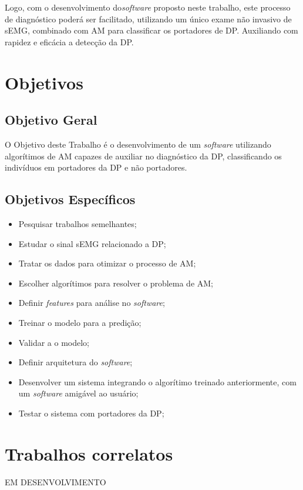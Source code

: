 Logo, com o desenvolvimento do\textit{software} proposto neste trabalho, este processo de diagnóstico poderá ser facilitado, utilizando um único exame não invasivo de sEMG, combinado com AM para classificar os portadores de DP. Auxiliando com rapidez e eficácia a detecção da DP. 

\section{Objetivos} 
\subsection{Objetivo Geral} 
O Objetivo deste Trabalho é o desenvolvimento de um \textit{software} utilizando algorítimos de AM capazes de auxiliar no diagnóstico da DP, classificando os indivíduos em portadores da DP e não portadores. 

\subsection{Objetivos Específicos}
\begin{itemize}
    \item Pesquisar trabalhos semelhantes;
    \item Estudar o sinal sEMG relacionado a DP;
    \item Tratar os dados para otimizar o processo de AM;
    \item Escolher algorítimos para resolver o problema de AM;
    \item Definir \textit{features} para análise no \textit{software};
    \item Treinar o modelo para a predição;
    \item Validar a o modelo;
    \item Definir arquitetura do \textit{software};
    \item Desenvolver um sistema integrando o algorítimo treinado anteriormente, com um \textit{software} amigável ao usuário;
    \item Testar o sistema com portadores da DP;
\end{itemize}

\section{Trabalhos correlatos}
EM DESENVOLVIMENTO